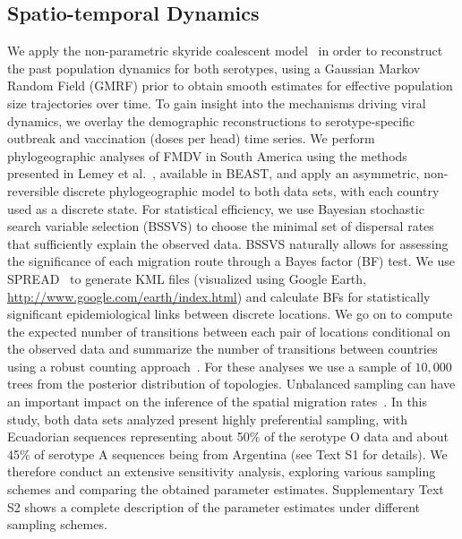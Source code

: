 \documentclass[10pt]{article}
\begin{document}
% 

\subsection*{Spatio-temporal Dynamics}

We apply the non-parametric skyride coalescent model~\citep{Minin2008a} in order to reconstruct the past population dynamics for both serotypes, using a Gaussian Markov Random Field (GMRF) prior to obtain smooth estimates for effective population size trajectories over time.
To gain insight into the mechanisms driving viral dynamics, we overlay the demographic reconstructions to serotype-specific outbreak and vaccination (doses per head) time series.
We perform phylogeographic analyses of FMDV in South America using the methods presented in Lemey et al.~\citep{Lemey2009}, available in BEAST, and apply an asymmetric, non-reversible discrete phylogeographic model to both data sets, with each country used as a discrete state.
For statistical efficiency, we use Bayesian stochastic search variable selection (BSSVS) to choose the minimal set of dispersal rates that sufficiently explain the observed data.
BSSVS naturally allows for assessing the significance of each migration route through a Bayes factor (BF) test.
We use SPREAD~\citep{Bielejec2011} to generate KML files (visualized using Google Earth, \url{http://www.google.com/earth/index.html}) and calculate BFs for statistically significant epidemiological links between discrete locations.
We go on to compute the expected number of transitions between each pair of locations conditional on the observed data and summarize the number of transitions between countries using a robust counting approach~\citep{Minin2008b}.
For these analyses we use a sample of $10,000$ trees from the posterior distribution of topologies.
Unbalanced sampling can have an important impact on the inference of the spatial migration rates~\citep{Faria2012, Lemey2014, Frost2015}.
In this study, both data sets analyzed present highly preferential sampling, with Ecuadorian sequences representing about 50\% of the serotype O data and about 45\% of serotype A sequences being from Argentina (see Text S1 for details).
We therefore conduct an extensive sensitivity analysis, exploring various sampling schemes and comparing the obtained parameter estimates.
Supplementary Text S2 shows a complete description of the parameter estimates under different sampling schemes. 
\end{document}
